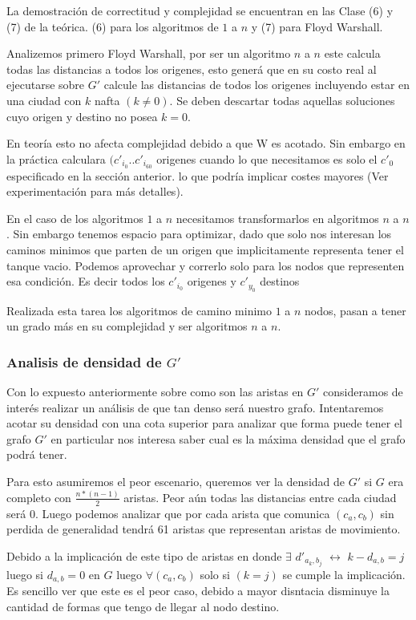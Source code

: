 \documentclass[12pt]{article}
\begin{document}
La demostración de correctitud y complejidad se encuentran en las Clase (6) y (7) de la teórica. (6) para los algoritmos de $1$ a $n$ y (7) para Floyd Warshall.

Analizemos primero Floyd Warshall, por ser un algoritmo $n$ a $n$ este calcula todas las distancias a todos los origenes, esto generá que en su costo real al ejecutarse sobre $G'$ calcule las distancias de todos los origenes incluyendo estar en una ciudad con $k$ nafta $(k \neq 0)$. Se deben descartar todas aquellas soluciones cuyo origen y destino no posea $k = 0$. 

En teoría esto no afecta complejidad debido a que W es acotado. Sin embargo en la práctica calculara $(c'_{i_0}..c'_{i_{60}}$ origenes cuando lo que necesitamos es solo el $c'_0$ especificado en la sección anterior. lo que podría implicar costes mayores (Ver experimentación para más detalles).

En el caso de los algoritmos $1$ a $n$ necesitamos transformarlos en algoritmos $n$ a $n$. Sin embargo tenemos espacio para optimizar, dado que solo nos interesan los caminos minimos que parten de un origen que implicitamente representa tener el tanque vacio. Podemos aprovechar y correrlo solo para los nodos que representen esa condición. Es decir todos los $c'_{i_0}$ origenes y $c'_{y_0}$ destinos

Realizada esta tarea los algoritmos de camino minimo $1$ a $n$ nodos, pasan a tener un grado más en su complejidad y ser algoritmos $n$ a $n$.

\subsubsection{Analisis de densidad de $G'$}

Con lo expuesto anteriormente sobre como son las aristas en $G'$ consideramos de interés realizar un análisis de que tan denso será nuestro grafo. Intentaremos acotar su densidad con una cota superior para analizar que forma puede tener el grafo $G'$ en particular nos interesa saber cual es la máxima densidad que el grafo podrá tener.

Para esto asumiremos el peor escenario, queremos ver la densidad de $G'$ si $G$ era completo con $\frac{n*(n - 1)}{2}$ aristas. Peor aún todas las distancias entre cada ciudad será 0. Luego podemos analizar que por cada arista que comunica $(c_a,c_b)$ sin perdida de generalidad tendrá 61 aristas que representan aristas de movimiento. 

Debido a la implicación de este tipo de aristas en donde $\exists$ $d'_{a_k,b_j}$ $\leftrightarrow$  $k - d_{a,b} = j$ luego si $d_{a,b} = 0$ en $G$ luego $\forall (c_a, c_b)$ solo si $(k = j)$ se cumple la implicación. Es sencillo ver que este es el peor caso, debido a mayor disntacia disminuye la cantidad de formas que tengo de llegar al nodo destino.
\end{document}
